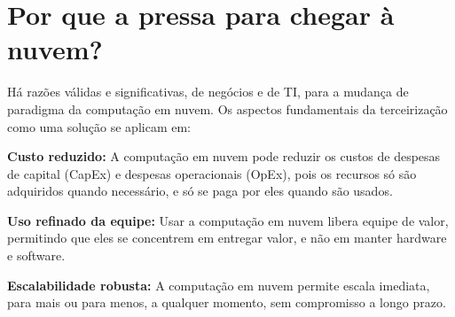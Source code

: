 \section{Por que a pressa para chegar à nuvem?}

Há razões válidas e significativas, de negócios e de TI, para a mudança de
paradigma da computação em nuvem. Os aspectos fundamentais da terceirização como
uma solução se aplicam em: 

\newcommand{\itemm}[1]{\item\textbf{#1}}

\begin{itemise}
    \itemm{Custo reduzido:} A computação em nuvem pode reduzir os custos de
        despesas de capital (CapEx) e despesas operacionais (OpEx), pois os recursos
        só são adquiridos quando necessário, e só se paga por eles quando são usados.

    \itemm{Uso refinado da equipe:} Usar a computação em nuvem libera equipe de
        valor, permitindo que eles se concentrem em entregar valor, e não em manter
        hardware e software.

    \itemm {Escalabilidade robusta:} A computação em nuvem permite escala imediata,
        para mais ou para menos, a qualquer momento, sem compromisso a longo prazo.
\end{itemise}

\undef\itemm
